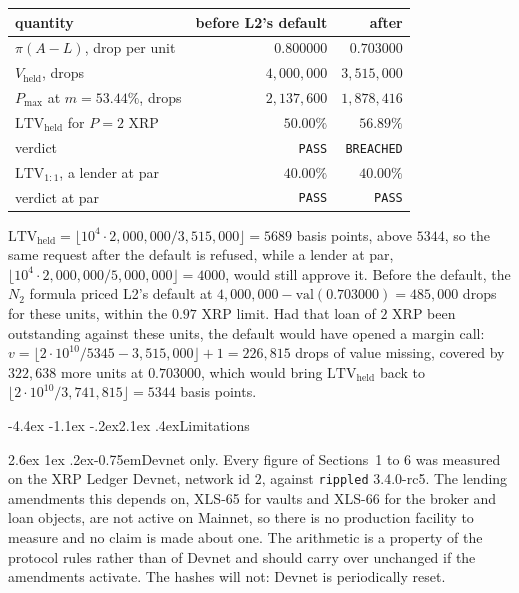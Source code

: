 \documentclass[11pt]{article}
\makeatletter
\renewcommand\section{\@startsection{section}{1}{\z@}%
  {-4.4ex \@plus -1.1ex \@minus -.2ex}{2.1ex \@plus .4ex}{\normalfont\Large\bfseries}}
\renewcommand\paragraph{\@startsection{paragraph}{4}{\z@}%
  {2.6ex \@plus 1ex \@minus .2ex}{-0.75em}{\normalfont\normalsize\bfseries}}
\theoremstyle{orma}
\theoremstyle{ormaupright}
\makeatother
\begin{document}
\begin{center}
\begin{tabular}{lrr}
\toprule
quantity & before L2's default & after \\
\midrule
$\pi(A - L)$, drop per unit & $0.800000$ & $0.703000$ \\
$V_{\mathrm{held}}$, drops & $4{,}000{,}000$ & $3{,}515{,}000$ \\
$P_{\max}$ at $m = 53.44\%$, drops & $2{,}137{,}600$ & $1{,}878{,}416$ \\
$\mathrm{LTV}_{\mathrm{held}}$ for $P = 2$ XRP & $50.00\%$ & $\mathbf{56.89\%}$ \\
verdict & \texttt{PASS} & \texttt{BREACHED} \\
\addlinespace
$\mathrm{LTV}_{1:1}$, a lender at par & $40.00\%$ & $40.00\%$ \\
verdict at par & \texttt{PASS} & \texttt{PASS} \\
\bottomrule
\end{tabular}
\end{center}

$\mathrm{LTV}_{\mathrm{held}} = \lfloor 10^{4} \cdot 2{,}000{,}000 / 3{,}515{,}000 \rfloor
= 5689$ basis points, above $5344$, so the same request after the default is refused, while
a lender at par, $\lfloor 10^{4} \cdot 2{,}000{,}000 / 5{,}000{,}000 \rfloor = 4000$,
would still approve it. Before the default, the $N_2$ formula priced L2's default at
$4{,}000{,}000 - \mathrm{val}(0.703000) = 485{,}000$ drops for these units, within the
$0.97$ XRP limit. Had that loan of $2$ XRP been outstanding against these units, the default
would have opened a margin call: $v = \lfloor 2 \cdot 10^{10} / 5345 - 3{,}515{,}000 \rfloor + 1
= 226{,}815$ drops of value missing, covered by $322{,}638$ more units at $0.703000$, which
would bring $\mathrm{LTV}_{\mathrm{held}}$ back to $\lfloor 2 \cdot 10^{10} / 3{,}741{,}815 \rfloor
= 5344$ basis points.

\section{Limitations}
\label{sec:limits}

\paragraph{Devnet only.} Every figure of Sections~1 to 6 was measured on the XRP Ledger Devnet, network id
$2$, against \texttt{rippled} 3.4.0-rc5. The lending amendments this depends on, XLS-65 for
vaults and XLS-66 for the broker and loan objects, are not active on Mainnet, so there is no
production facility to measure and no claim is made about one. The arithmetic is a property
of the protocol rules rather than of Devnet and should carry over unchanged if the
amendments activate. The hashes will not: Devnet is periodically reset.
\end{document}
